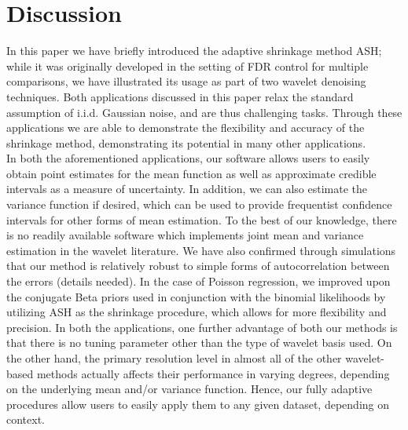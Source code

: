 \documentclass[12pt]{article}
\begin{document}
\section{Discussion}
In this paper we have briefly introduced the adaptive shrinkage method ASH; while it was originally developed in the setting of FDR control for multiple comparisons, we have illustrated its usage as part of two wavelet denoising techniques. Both applications discussed in this paper relax the standard assumption of i.i.d. Gaussian noise, and are thus challenging tasks. Through these applications we are able to demonstrate the flexibility and accuracy of the shrinkage method, demonstrating its potential in many other applications.\bigskip\\
In both the aforementioned applications, our software allows users to easily obtain point estimates for the mean function as well as approximate credible intervals as a measure of uncertainty. In addition, we can also estimate the variance function if desired, which can be used to provide frequentist confidence intervals for other forms of mean estimation. To the best of our knowledge, there is no readily available software which implements joint mean and variance estimation in the wavelet literature. We have also confirmed through simulations that our method is relatively robust to simple forms of autocorrelation between the errors (details needed). In the case of Poisson regression, we improved upon the conjugate Beta priors used in conjunction with the binomial likelihoods by utilizing ASH as the shrinkage procedure, which allows for more flexibility and precision. %
In both the applications, one further advantage of both our methods is that there is no tuning parameter other than the type of wavelet basis used. On the other hand, the primary resolution level in almost all of the other wavelet-based methods actually affects their performance in varying degrees, depending on the underlying mean and/or variance function. Hence, our fully adaptive procedures allow users to easily apply them to any given dataset, depending on context.\bigskip\\
\end{document}
